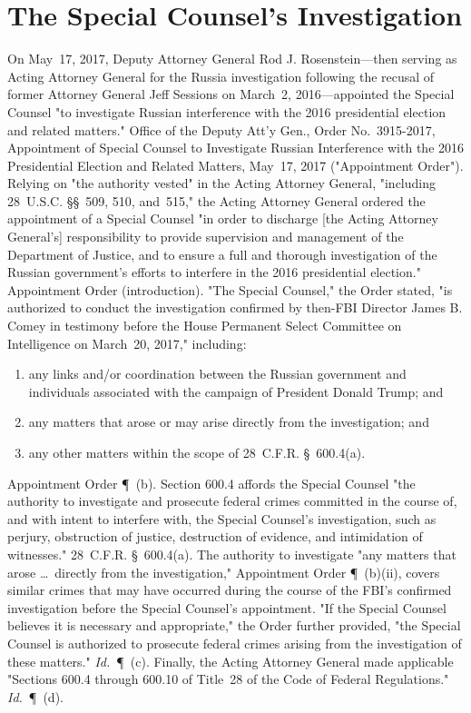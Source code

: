 \section{The Special Counsel's Investigation}

On May~17, 2017, Deputy Attorney General Rod J. Rosenstein---then serving as Acting Attorney General for the Russia investigation following the recusal of former Attorney General Jeff Sessions on March~2, 2016---appointed the Special Counsel "to investigate Russian interference with the 2016 presidential election and related matters."
Office of the Deputy Att'y Gen., Order No.~3915-2017, Appointment of Special Counsel to Investigate Russian Interference with the 2016 Presidential Election and Related Matters, May~17, 2017 ("Appointment Order").
Relying on "the authority vested" in the Acting Attorney General, "including 28~U.S.C. \S\S~509, 510, and~515," the Acting Attorney General ordered the appointment of a Special Counsel "in order to discharge [the Acting Attorney General's] responsibility to provide supervision and management of the Department of Justice, and to ensure a full and thorough investigation of the Russian government's efforts to interfere in the 2016 presidential election." Appointment Order (introduction).
"The Special Counsel," the Order stated, "is authorized to conduct the investigation confirmed by then-FBI Director James B. Comey in testimony before the House Permanent Select Committee on Intelligence on March~20, 2017," including:

\begin{enumerate}[i]
  \item any links and/or coordination between the Russian government and individuals associated with the campaign of President Donald Trump; and
  \item any matters that arose or may arise directly from the investigation; and
  \item any other matters within the scope of 28~C.F.R. \S~600.4(a).
\end{enumerate}

Appointment Order \P~(b). Section 600.4 affords the Special Counsel "the authority to investigate and prosecute federal crimes committed in the course of, and with intent to interfere with, the Special Counsel's investigation, such as perjury, obstruction of justice, destruction of evidence, and intimidation of witnesses." 28~C.F.R. \S~600.4(a).
The authority to investigate "any matters that arose \dots\ directly from the investigation," Appointment Order \P~(b)(ii), covers similar crimes that may have occurred during the course of the FBI's confirmed investigation before the Special Counsel's appointment.
"If the Special Counsel believes it is necessary and appropriate," the Order further provided, "the Special Counsel is authorized to prosecute federal crimes arising from the investigation of these matters." \textit{Id.}~\P~(c).
Finally, the Acting Attorney General made applicable "Sections 600.4 through 600.10 of Title~28 of the Code of Federal Regulations." \textit{Id.}~\P~(d).

